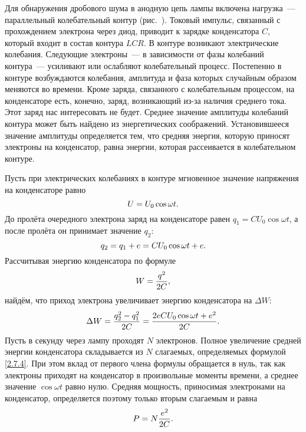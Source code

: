 Для обнаружения дробового шума в анодную цепь лампы включена нагрузка~--- параллельный колебательный контур (рис.~).
Токовый импульс, связанный с прохождением электрона через диод, приводит к зарядке конденсатора $C$, который входит в
состав контура $LCR$. В контуре возникают электрические колебания. Следующие электроны~--- в зависимости от фазы
колебаний контура~--- усиливают или ослабляют колебательный процесс. Постепенно в контуре возбуждаются колебания,
амплитуда и фаза которых случайным образом меняются во времени. Кроме заряда, связанного с колебательным процессом, на
конденсаторе есть, конечно, заряд, возникающий из-за наличия среднего тока. Этот заряд нас интересовать не будет.
Среднее значение амплитуды колебаний контура может быть найдено из энергетических соображений. Установившееся значение
амплитуды определяется тем, что средняя энергия, которую приносят электроны на конденсатор, равна энергии, которая
рассеивается в колебательном контуре.

Пусть при электрических колебаниях в контуре мгновенное значение напряжения на конденсаторе равно
\begin{equation}
	\eqmark{2.7.1}
	U=U_0\cos\omega t.
\end{equation}
До пролёта очередного электрона заряд на конденсаторе равен $q_1=CU_0\cos\omega t$, а после пролёта он принимает значение
$q_2$:
\begin{equation}
	\eqmark{2.7.2}
	q_2=q_1+e=CU_0\cos\omega t+e.
\end{equation}
Рассчитывая энергию конденсатора по формуле
\begin{equation}
	\eqmark{2.7.3}
	W=\frac{q^2}{2C},
\end{equation}
найдём, что приход электрона увеличивает энергию конденсатора на $\Delta W$:
\begin{equation}
	\eqmark{2.7.4}
	\Delta W=\frac{q_2^2-q_1^2}{2C}=\frac{2eCU_0\cos\omega t+e^2}{2C}.
\end{equation}
Пусть в секунду через лампу проходят $N$ электронов. Полное увеличение средней энергии конденсатора складывается из $N$
слагаемых, определяемых формулой \eqref{2.7.4}. При этом вклад от первого члена формулы обращается в нуль, так как электроны
приходят на конденсатор в произвольные моменты времени, а среднее значение $\cos\omega t$ равно нулю. Средняя мощность,
приносимая электронами на конденсатор, определяется поэтому только вторым слагаемым и равна
\begin{equation}
	\eqmark{2.7.5}
	P=N\frac{e^2}{2C}.
\end{equation}

